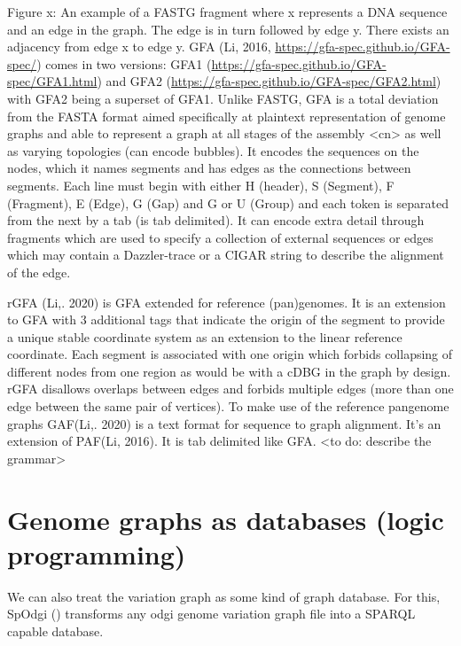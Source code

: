\documentclass[11pt]{article}
\begin{document}
Figure x: An example of a FASTG fragment where x represents a DNA sequence and an edge in the graph. The edge is in turn followed by edge y. There exists an adjacency from edge x to edge y.
GFA (Li, 2016, \url{https://gfa-spec.github.io/GFA-spec/}) comes in two versions: GFA1 (\url{https://gfa-spec.github.io/GFA-spec/GFA1.html}) and GFA2 (\url{https://gfa-spec.github.io/GFA-spec/GFA2.html}) with GFA2 being a superset of GFA1. 
Unlike FASTG, GFA is a total deviation from the FASTA format aimed specifically at plaintext representation of genome graphs and able to represent a graph at all stages of the assembly <cn> as well as varying topologies (can encode bubbles). It encodes the sequences on the nodes, which it names segments and has edges as the connections between segments. 
Each line must begin with either H (header), S (Segment), F (Fragment), E (Edge), G (Gap) and G or U (Group) and each token is separated from the next by a tab (is tab delimited). It can encode extra detail through fragments which are used to specify a collection of external sequences or edges which may contain a Dazzler-trace or a CIGAR string to describe the alignment of the edge.

rGFA (Li,. 2020) is GFA extended for reference (pan)genomes. It is an extension to GFA with 3 additional tags that indicate the origin of the segment to provide a unique stable coordinate system as an extension to the linear reference coordinate. Each segment is associated with one origin which forbids collapsing of different nodes from one region as would be with a cDBG  in the graph by design. rGFA disallows overlaps between edges and forbids multiple edges (more than one edge between the same pair of vertices). 
To make use of the reference pangenome graphs GAF(Li,. 2020) is a text format for sequence to graph alignment. It’s an extension of PAF(Li, 2016). It is tab delimited like GFA. <to do: describe the grammar>

\section{Genome graphs as databases (logic programming)}
\label{sec:orgd852fb4}
We can also treat the variation graph as some kind of graph database. For this, SpOdgi () transforms any odgi genome variation graph file into a SPARQL capable database.
\end{document}
